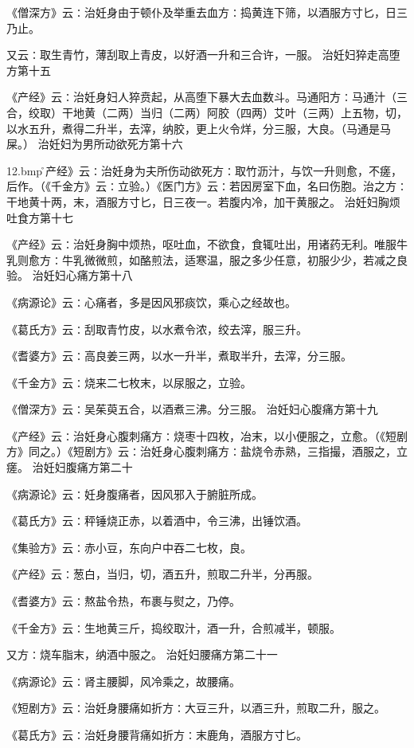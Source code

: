 \documentclass[a4paper,12pt,UTF8,twoside]{ctexbook}
\begin{document}
《僧深方》云∶治妊身由于顿仆及举重去血方∶捣黄连下筛，以酒服方寸匕，日三乃止。

又云∶取生青竹，薄刮取上青皮，以好酒一升和三合许，一服。
治妊妇猝走高堕方第十五

《产经》云∶治妊身妇人猝贲起，从高堕下暴大去血数斗。马通阳方∶马通汁（三合，绞取）干地黄（二两）当归（二两）阿胶（四两）艾叶（三两）上五物，切，以水五升，煮得二升半，去滓，纳胶，更上火令烊，分三服，大良。（马通是马屎。）
治妊妇为男所动欲死方第十六

\pyxfc12.bmp\r《产经》云∶治妊身为夫所伤动欲死方∶取竹沥汁，与饮一升则愈，不瘥，后作。（《千金方》云∶立验。）《医门方》云∶若因房室下血，名曰伤胞。治之方∶干地黄十两，末，酒服方寸匕，日三夜一。若腹内冷，加干黄服之。
治妊妇胸烦吐食方第十七

《产经》云∶治妊身胸中烦热，呕吐血，不欲食，食辄吐出，用诸药无利。唯服牛乳则愈方∶牛乳微微煎，如酪煎法，适寒温，服之多少任意，初服少少，若减之良验。
治妊妇心痛方第十八

《病源论》云∶心痛者，多是因风邪痰饮，乘心之经故也。

《葛氏方》云∶刮取青竹皮，以水煮令浓，绞去滓，服三升。

《耆婆方》云∶高良姜三两，以水一升半，煮取半升，去滓，分三服。

《千金方》云∶烧来二七枚末，以尿服之，立验。

《僧深方》云∶吴茱萸五合，以酒煮三沸。分三服。
治妊妇心腹痛方第十九

《产经》云∶治妊身心腹刺痛方∶烧枣十四枚，冶末，以小便服之，立愈。（《短剧方》同之。）《短剧方》云∶治妊身心腹刺痛方∶盐烧令赤熟，三指撮，酒服之，立瘥。
治妊妇腹痛方第二十

《病源论》云∶妊身腹痛者，因风邪入于腑脏所成。

《葛氏方》云∶秤锤烧正赤，以着酒中，令三沸，出锤饮酒。

《集验方》云∶赤小豆，东向户中吞二七枚，良。

《产经》云∶葱白，当归，切，酒五升，煎取二升半，分再服。

《耆婆方》云∶熬盐令热，布裹与熨之，乃停。

《千金方》云∶生地黄三斤，捣绞取汁，酒一升，合煎减半，顿服。

又方∶烧车脂末，纳酒中服之。
治妊妇腰痛方第二十一

《病源论》云∶肾主腰脚，风冷乘之，故腰痛。

《短剧方》云∶治妊身腰痛如折方∶大豆三升，以酒三升，煎取二升，服之。

《葛氏方》云∶治妊身腰背痛如折方∶末鹿角，酒服方寸匕。
\end{document}
